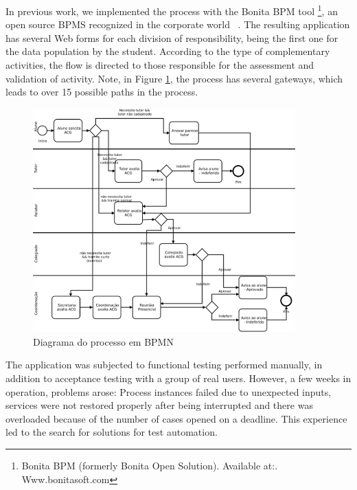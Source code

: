 \documentclass[runningheads,a4paper]{llncs}
\begin{document}
{In previous work, we implemented the process with the Bonita BPM tool \footnote{Bonita BPM (formerly Bonita Open Solution). Available at:. Www.bonitasoft.com}, an open source BPMS recognized in the corporate world ~\cite{forrester}. The resulting application has several Web forms for each division of responsibility, being the first one for the data population by the student. According to the type of complementary activities, the flow is directed to those responsible for the assessment and validation of activity. Note, in Figure \ref{fig:diagrama}, the process has several gateways, which leads to over 15 possible paths in the process.

\begin{figure}[ht]
\centering
\includegraphics[width=0.9\textwidth]{figuras/processo.png}
\caption{Diagrama do processo em BPMN}
\label{fig:diagrama}
\end{figure}

The application was subjected to functional testing performed manually, in addition to acceptance testing with a group of real users. However, a few weeks in operation, problems arose: Process instances failed due to unexpected inputs, services were not restored properly after being interrupted and there was overloaded because of the number of cases opened on a deadline. This experience led to the search for solutions for test automation.


}
\end{document}
